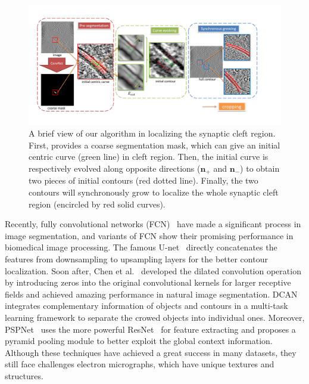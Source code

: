 \begin{figure}[t]
    \begin{center}
        \includegraphics[width=7in]{figs/FigCG.pdf}
   \end{center}
\caption{A brief view of our algorithm in localizing the synaptic cleft region. First,  provides a coarse segmentation mask, which can give an initial centric curve (green line) in  cleft region.
        Then, the initial curve is respectively evolved along  opposite directions ($\mathbf{n}_+$ and $\mathbf{n}_-$) to obtain two pieces of initial contours (red dotted line).
        Finally, the two contours will synchronously grow to localize the whole synaptic cleft region (encircled by red solid curves).}
\label{fig:cg}
\end{figure}


Recently, fully convolutional networks (FCN)~\cite{Long2015,Ronneberger2015,Chen2016a,Chen2017,Zhao2016} have made a significant process in image segmentation, and variants of FCN \cite{Ronneberger2015,Chen2017,Dhungel2015,Lieman-Sifry2017,Chen2016b,Ourselin} show their promising performance in biomedical image processing.
%
The famous U-net~\cite{Ronneberger2015} directly concatenates the features from downsampling to upsampling layers for the better contour localization.
Soon after, Chen et al.~\cite{Chen2016a} developed the dilated convolution operation by introducing zeros into the original convolutional kernels for larger receptive fields and achieved amazing performance in natural image segmentation.
DCAN~\cite{Chen2017} integrates complementary information of objects and contours in a multi-task learning framework to separate the crowed objects into individual ones.
Moreover, PSPNet~\cite{Zhao2016} uses the more powerful ResNet~\cite{He2016} for feature extracting and proposes a pyramid pooling module to better exploit the global context information.
%
Although these techniques have achieved a great success in many datasets, they still face challenges  electron micrographs, which have unique textures and structures.

